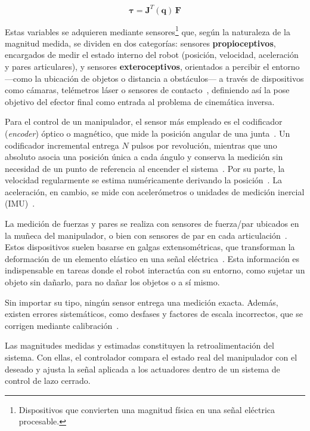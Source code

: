 \begin{equation}
\label{ec:fuerzas}
    \boldsymbol{\tau} = \mathbf{J}^{T}(\mathbf{q})\,\mathbf{F}
\end{equation}

Estas variables se adquieren mediante sensores\footnote{Dispositivos que convierten una magnitud física en una señal eléctrica procesable.} que, según la naturaleza de la magnitud medida, se dividen en dos categorías: sensores \textbf{propioceptivos}, encargados de medir el estado interno del robot (posición, velocidad, aceleración y pares articulares), y sensores \textbf{exteroceptivos}, orientados a percibir el entorno —como la ubicación de objetos o distancia a obstáculos— a través de dispositivos como cámaras, telémetros láser o sensores de contacto~\cite{handbook_sensing}, definiendo así la pose objetivo del efector final como entrada al problema de cinemática inversa.

Para el control de un manipulador, el sensor más empleado es el codificador (\emph{encoder}) óptico o magnético, que mide la posición angular de una junta~\cite{craig,siciliano2009}. Un codificador incremental entrega $N$ pulsos por revolución, mientras que uno absoluto asocia una posición única a cada ángulo y conserva la medición sin necesidad de un punto de referencia al encender el sistema~\cite{craig,siciliano2009}. Por su parte, la velocidad regularmente se estima numéricamente derivando la posición~\cite{craig,siciliano2009}. La aceleración, en cambio, se mide con acelerómetros o unidades de medición inercial (IMU)~\cite{handbook_sensing}.

La medición de fuerzas y pares se realiza con sensores de fuerza/par ubicados en la muñeca del manipulador, o bien con sensores de par en cada articulación~\cite{spong2020}. Estos dispositivos suelen basarse en galgas extensométricas, que transforman la deformación de un elemento elástico en una señal eléctrica~\cite{siciliano2009}. Esta información es indispensable en tareas donde el robot interactúa con su entorno, como sujetar un objeto sin dañarlo, para no dañar los objetos o a sí mismo.

Sin importar su tipo, ningún sensor entrega una medición exacta. Además, existen errores sistemáticos, como desfases y factores de escala incorrectos, que se corrigen mediante calibración~\cite{handbook_sensing}.

Las magnitudes medidas y estimadas constituyen la retroalimentación del sistema. Con ellas, el controlador compara el estado real del manipulador con el deseado y ajusta la señal aplicada a los actuadores dentro de un sistema de control de lazo cerrado.

